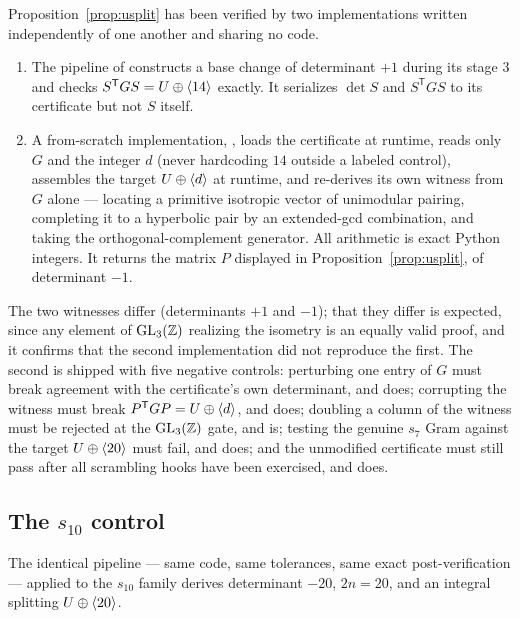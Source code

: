 \begin{remark}\label{rem:two-verifications}
Proposition~\ref{prop:usplit} has been verified by two implementations written
independently of one another and sharing no code.
\begin{enumerate}
\item The pipeline of  constructs a base change
  of determinant $+1$ during its stage 3 and checks $S^{\mathsf T}GS =
  U\oplus\langle 14\rangle$ exactly. It serializes $\det S$ and $S^{\mathsf T}GS$ to
  its certificate but not $S$ itself.
\item A from-scratch implementation, ,
  loads the certificate at runtime, reads only $G$ and the integer $d$ (never
  hardcoding $14$ outside a labeled control), assembles the target
  $U\oplus\langle d\rangle$ at runtime, and re-derives its own witness from $G$ alone
  --- locating a primitive isotropic vector of unimodular pairing, completing
  it to a hyperbolic pair by an extended-gcd combination, and taking the
  orthogonal-complement generator. All arithmetic is exact Python integers. It
  returns the matrix $P$ displayed in Proposition~\ref{prop:usplit}, of
  determinant $-1$.
\end{enumerate}
The two witnesses differ (determinants $+1$ and $-1$); that they differ is
expected, since any element of $\operatorname{GL}_3(\mathbb{Z})$ realizing the isometry is an equally
valid proof, and it confirms that the second implementation did not reproduce
the first. The second is shipped with five negative controls: perturbing one
entry of $G$ must break agreement with the certificate's own determinant, and
does; corrupting the witness must break $P^{\mathsf T}GP = U\oplus\langle d\rangle$,
and does; doubling a column of the witness must be rejected at the
$\operatorname{GL}_3(\mathbb{Z})$ gate, and is; testing the genuine $s_7$ Gram against the target
$U\oplus\langle 20\rangle$ must fail, and does; and the unmodified certificate must
still pass after all scrambling hooks have been exercised, and does.
\end{remark}

\subsection{The \texorpdfstring{$s_{10}$}{s10} control}\label{subsec:s10-control}

\begin{numclaim}\label{nc:s10-control}
The identical pipeline --- same code, same tolerances, same exact
post-verification --- applied to the $s_{10}$ family derives determinant $-20$,
$2n = 20$, and an integral splitting $U\oplus\langle 20\rangle$.
\end{numclaim}

